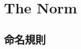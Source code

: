 \documentclass{42-ja}
\begin{document}
\newpage

\chapter{The Norm}


    \section{命名規則}
\end{document}
